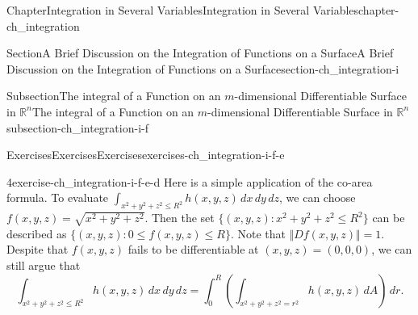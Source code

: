 \documentclass[oneside,10pt,]{book}
\numberwithin{equation}{section}
\newcommand{\bbR}{\mathbb{R}}
\begin{document}
\begin{chapterptx}{Chapter}{Integration in Several Variables}{}{Integration in Several Variables}{}{}{chapter-ch_integration}
\begin{sectionptx}{Section}{A Brief Discussion on the Integration of Functions on a Surface}{}{A Brief Discussion on the Integration of Functions on a Surface}{}{}{section-ch_integration-i}
\begin{subsectionptx}{Subsection}{The integral of a Function on an \(m\)-dimensional Differentiable Surface in \(\bbR^{n}\)}{}{The integral of a Function on an \(m\)-dimensional Differentiable Surface in \(\bbR^{n}\)}{}{}{subsection-ch_integration-i-f}
\begin{exercises-subsubsection-numberless}{Exercises}{Exercises}{}{Exercises}{}{}{exercises-ch_integration-i-f-e}
\begin{divisionexercise}{4}{}{}{exercise-ch_integration-i-f-e-d}
Here is a simple application of the co-area formula. To evaluate \(\int_{x^{2}+y^{2}+z^{2}\le R^{2}} h(x, y, z)\, dx\, dy\, dz\), we can choose \(f(x, y, z)=\sqrt{x^{2}+y^{2}+z^{2}}\). Then the set \(\{(x, y, z): x^{2}+y^{2}+z^{2}\le R^{2}\}\) can be described as \(\{(x, y, z): 0\le f(x, y, z) \le R\}\). Note that \(\Vert Df(x, y, z)\Vert=1\). Despite that \(f(x, y, z)\) fails to be differentiable at \((x, y, z)=(0, 0, 0)\), we can still argue that%
\begin{equation*}
\int_{x^{2}+y^{2}+z^{2}\le R^{2}} h(x, y, z)\, dx\, dy\, dz
=\int_{0}^{R} \left( \int_{x^{2}+y^{2}+z^{2}=r^{2}} h(x, y, z)\, dA\right)\, dr.
\end{equation*}
%
\end{divisionexercise}%
\end{exercises-subsubsection-numberless}
\end{subsectionptx}
\end{sectionptx}
\end{chapterptx}
%
%
\typeout{************************************************}
\typeout{************************************************}
%
\end{document}
